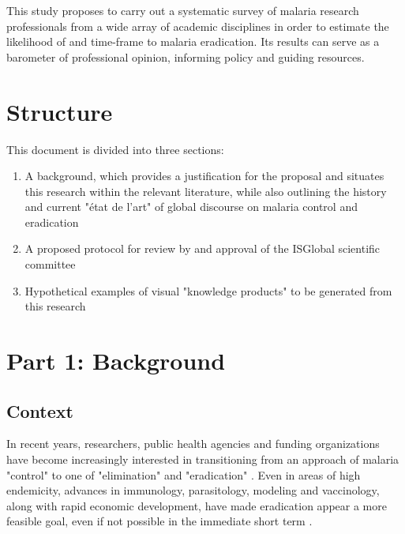 \documentclass{article}
\begin{document}
\noindent This study proposes to carry out a systematic survey of malaria research professionals from a wide array of academic disciplines in order to estimate the likelihood of and time-frame to malaria eradication. Its results can serve as a barometer of professional opinion, informing policy and guiding resources.



\section*{Structure}

This document is divided into three sections:
\vspace{-3mm}

\begin{enumerate}
  \setlength\itemsep{-0.5em}
\item A background, which provides a justification for the proposal and situates this research within the relevant literature, while also outlining the history and current "état de l'art" of global discourse on malaria control and eradication
\item A proposed protocol for review by and approval of the ISGlobal scientific committee
\item Hypothetical examples of visual "knowledge products" to be generated from this research
\end{enumerate}



\vspace{5mm}

\tableofcontents


\newpage  
\section*{Part 1: Background}


\subsection*{Context}

In recent years, researchers, public health agencies and funding organizations have become increasingly interested in transitioning from an approach of malaria "control" to one of "elimination" and "eradication" \cite{Tanner2015}. Even in areas of high endemicity, advances in immunology, parasitology, modeling and vaccinology, along with rapid economic development, have made eradication appear a more feasible goal, even if not possible in the immediate short term \cite{Snow2015, Eckhoff2014}.  \\
\end{document}
